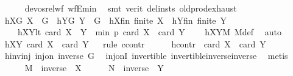 \begin{isabellebody}
\ \ \ \ \isamarkupfalse%
\ devos{\isacharunderscore}{\kern0pt}rel{\isacharunderscore}{\kern0pt}wf\ wfE{\isacharunderscore}{\kern0pt}min\ \isamarkupfalse%
\ {\isacharparenleft}{\kern0pt}smt\ {\isacharparenleft}{\kern0pt}verit{\isacharcomma}{\kern0pt}\ del{\isacharunderscore}{\kern0pt}insts{\isacharparenright}{\kern0pt}\ old{\isachardot}{\kern0pt}prod{\isachardot}{\kern0pt}exhaust{\isacharparenright}{\kern0pt}\isanewline
\ \ \isamarkupfalse%
\ hXG{\isacharcolon}{\kern0pt}\ {\isachardoublequoteopen}X\ {\isasymsubseteq}\ G{\isachardoublequoteclose}\ \ hYG{\isacharcolon}{\kern0pt}\ {\isachardoublequoteopen}Y\ {\isasymsubseteq}\ G{\isachardoublequoteclose}\ \ hXfin{\isacharcolon}{\kern0pt}\ {\isachardoublequoteopen}finite\ X{\isachardoublequoteclose}\ \ hYfin{\isacharcolon}{\kern0pt}\ {\isachardoublequoteopen}finite\ Y{\isachardoublequoteclose}\ \ \isanewline
\ \ \ \ hXYlt{\isacharcolon}{\kern0pt}\ {\isachardoublequoteopen}card\ {\isacharparenleft}{\kern0pt}X\ {\isasymcdots}\ Y{\isacharparenright}{\kern0pt}\ {\isacharless}{\kern0pt}\ min\ p\ {\isacharparenleft}{\kern0pt}card\ X\ {\isacharplus}{\kern0pt}\ card\ Y\ {\isacharminus}{\kern0pt}\ {}{\isacharparenright}{\kern0pt}{\isachardoublequoteclose}\ \isamarkupfalse%
\ hXYM\ M{\isacharunderscore}{\kern0pt}def\ \isamarkupfalse%
\ auto\isanewline
\ \ \isamarkupfalse%
\ hXY{\isacharcolon}{\kern0pt}\ {\isachardoublequoteopen}card\ X\ {\isasymle}\ card\ Y{\isachardoublequoteclose}\isanewline
\ \ \isamarkupfalse%
{\isacharparenleft}{\kern0pt}rule\ ccontr{\isacharparenright}{\kern0pt}\isanewline
\ \ \ \ \isamarkupfalse%
\ hcontr{\isacharcolon}{\kern0pt}\ {\isachardoublequoteopen}{\isasymnot}\ card\ X\ {\isasymle}\ card\ Y{\isachardoublequoteclose}\isanewline
\ \ \ \ \isamarkupfalse%
\ hinvinj{\isacharcolon}{\kern0pt}\ {\isachardoublequoteopen}inj{\isacharunderscore}{\kern0pt}on\ inverse\ G{\isachardoublequoteclose}\ \isamarkupfalse%
\ inj{\isacharunderscore}{\kern0pt}onI\ invertible\ invertible{\isacharunderscore}{\kern0pt}inverse{\isacharunderscore}{\kern0pt}inverse\ \isamarkupfalse%
\ metis\isanewline
\ \ \ \ \isamarkupfalse%
\ {\isacharquery}{\kern0pt}M\ {\isacharequal}{\kern0pt}\ {\isachardoublequoteopen}inverse\ {\isacharbackquote}{\kern0pt}\ X{\isachardoublequoteclose}\isanewline
\ \ \ \ \isamarkupfalse%
\ {\isacharquery}{\kern0pt}N\ {\isacharequal}{\kern0pt}\ {\isachardoublequoteopen}inverse\ {\isacharbackquote}{\kern0pt}\ Y{\isachardoublequoteclose}\isanewline

\end{isabellebody}
